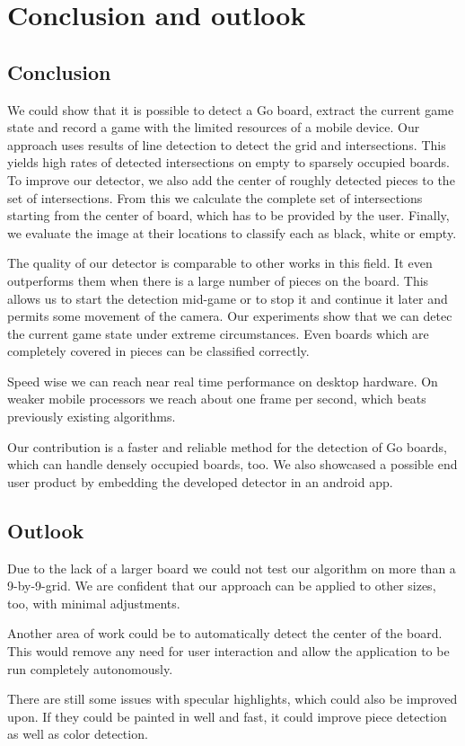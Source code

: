 
\chapter{Conclusion and outlook}
\section{Conclusion}
We could show that it is possible to detect a Go board, extract the current game state and record a game with the limited resources of a mobile device. Our approach uses results of line detection to detect the grid and intersections. This yields high rates of detected intersections on empty to sparsely occupied boards. To improve our detector, we also add the center of roughly detected pieces to the set of intersections. From this we calculate the complete set of intersections starting from the center of board, which has to be provided by the user. Finally, we evaluate the image at their locations to classify each as black, white or empty.

The quality of our detector is comparable to other works in this field. It even outperforms them when there is a large number of pieces on the board. This allows us to start the detection mid-game or to stop it and continue it later and permits some movement of the camera. Our experiments show that we can detec the current game state under extreme circumstances. Even boards which are completely covered in pieces can be classified correctly.

Speed wise we can reach near real time performance on desktop hardware. On weaker mobile processors we reach about one frame per second, which beats previously existing algorithms.

Our contribution is a faster and reliable method for the detection of Go boards, which can handle densely occupied boards, too. We also showcased a possible end user product by embedding the developed detector in an android app.

\section{Outlook}
Due to the lack of a larger board we could not test our algorithm on more than a 9-by-9-grid. We are confident that our approach can be applied to other sizes, too, with minimal adjustments.

Another area of work could be to automatically detect the center of the board. This would remove any need for user interaction and allow the application to be run completely autonomously.

There are still some issues with specular highlights, which could also be improved upon. If they could be painted in well and fast, it could improve piece detection as well as color detection.
